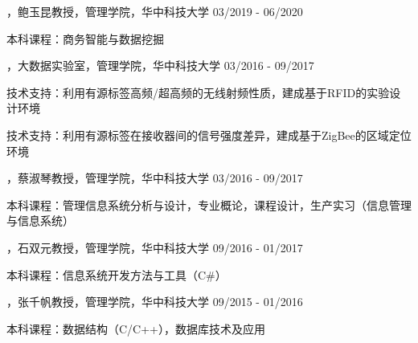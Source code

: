 
\begin{cventries}

\cvexperience
{，鲍玉昆教授，管理学院，华中科技大学}
{03/2019 - 06/2020}
{
    \begin{cvitems}
    \item {本科课程：商务智能与数据挖掘}
    \end{cvitems}
}

\cvexperience
{，大数据实验室，管理学院，华中科技大学}
{03/2016 - 09/2017}
{
    \begin{cvitems}
    \item {技术支持：利用有源标签高频/超高频的无线射频性质，建成基于RFID的实验设计环境}
    \item {技术支持：利用有源标签在接收器间的信号强度差异，建成基于ZigBee的区域定位环境}
    \end{cvitems}
}

\cvexperience
{，蔡淑琴教授，管理学院，华中科技大学}
{03/2016 - 09/2017}
{
    \begin{cvitems}
    \item {本科课程：管理信息系统分析与设计，专业概论，课程设计，生产实习（信息管理与信息系统）}
    \end{cvitems}
}

\cvexperience
{，石双元教授，管理学院，华中科技大学}
{09/2016 - 01/2017}
{
    \begin{cvitems}
    \item {本科课程：信息系统开发方法与工具（C\#）}
    \end{cvitems}
}

\cvexperience
{，张千帆教授，管理学院，华中科技大学}
{09/2015 - 01/2016}
{
    \begin{cvitems}
    \item {本科课程：数据结构（C/C++），数据库技术及应用}
    \end{cvitems}
}


\end{cventries}
